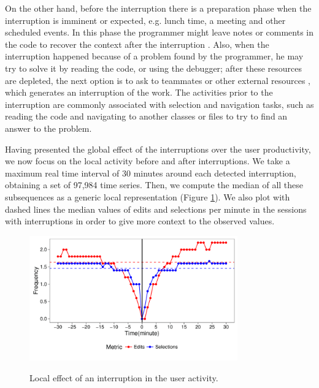 On the other hand, before the interruption there is a preparation phase when the interruption is imminent or expected, e.g. lunch time, a meeting and other scheduled events. In this phase the programmer might leave notes or comments in the code to recover the context after the interruption \cite{PD10}. Also, when the interruption happened because of a problem found by the programmer, he may try to solve it by reading the code, or using the debugger; after these resources are depleted, the next option is to ask to teammates or other external resources \cite{LVD06}, which generates an interruption of the work. The activities prior to the interruption are commonly associated with selection and navigation tasks, such as reading the code and navigating to another classes or files to try to find an answer to the problem. 

Having presented the global effect of the interruptions over the user productivity, we now focus on the local activity before and after interruptions. We take a maximum real time interval of 30 minutes around each detected interruption, obtaining a set of 97,984 time series. Then, we compute the median of all these subsequences as a generic local representation (Figure \ref{fig:udc_local_effect}). We also plot with dashed lines the median values of edits and selections per minute in the sessions with interruptions in order to give more context to the observed values.

\begin{figure}[!ht]
	\caption{Local effect of an interruption in the user activity.}
	\centering		
	\includegraphics[width=0.8\textwidth]{Figures/UDC_local_effect}
	\label{fig:udc_local_effect}
\end{figure}

